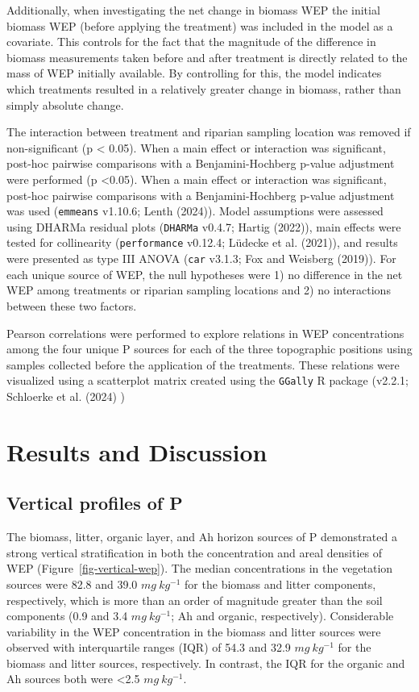 \documentclass[
]{agujournal2019}
\begin{document}
Additionally, when investigating the net change in biomass WEP the
initial biomass WEP (before applying the treatment) was included in the
model as a covariate. This controls for the fact that the magnitude of
the difference in biomass measurements taken before and after treatment
is directly related to the mass of WEP initially available. By
controlling for this, the model indicates which treatments resulted in a
relatively greater change in biomass, rather than simply absolute
change.

The interaction between treatment and riparian sampling location was
removed if non-significant (p \textless{} 0.05). When a main effect or
interaction was significant, post-hoc pairwise comparisons with a
Benjamini-Hochberg p-value adjustment were performed (p \textless0.05).
When a main effect or interaction was significant, post-hoc pairwise
comparisons with a Benjamini-Hochberg p-value adjustment was used
(\texttt{emmeans} v1.10.6; Lenth (2024)). Model assumptions were
assessed using DHARMa residual plots (\texttt{DHARMa} v0.4.7; Hartig
(2022)), main effects were tested for collinearity (\texttt{performance}
v0.12.4; Lüdecke et al. (2021)), and results were presented as type III
ANOVA (\texttt{car} v3.1.3; Fox and Weisberg (2019)). For each unique
source of WEP, the null hypotheses were 1) no difference in the net WEP
among treatments or riparian sampling locations and 2) no interactions
between these two factors.

Pearson correlations were performed to explore relations in WEP
concentrations among the four unique P sources for each of the three
topographic positions using samples collected before the application of
the treatments. These relations were visualized using a scatterplot
matrix created using the \texttt{GGally} R package (v2.2.1; Schloerke et
al. (2024) )

\section{Results and Discussion}\label{results-and-discussion}

\subsection{Vertical profiles of P}\label{vertical-profiles-of-p}

The biomass, litter, organic layer, and Ah horizon sources of P
demonstrated a strong vertical stratification in both the concentration
and areal densities of WEP (Figure~\ref{fig-vertical-wep}). The median
concentrations in the vegetation sources were 82.8 and 39.0
\(mg~kg^{-1}\) for the biomass and litter components, respectively,
which is more than an order of magnitude greater than the soil
components (0.9 and 3.4 \(mg~kg^{-1}\); Ah and organic, respectively).
Considerable variability in the WEP concentration in the biomass and
litter sources were observed with interquartile ranges (IQR) of 54.3 and
32.9 \(mg~kg^{-1}\) for the biomass and litter sources, respectively. In
contrast, the IQR for the organic and Ah sources both were \textless2.5
\(mg~kg^{-1}\).
\end{document}

